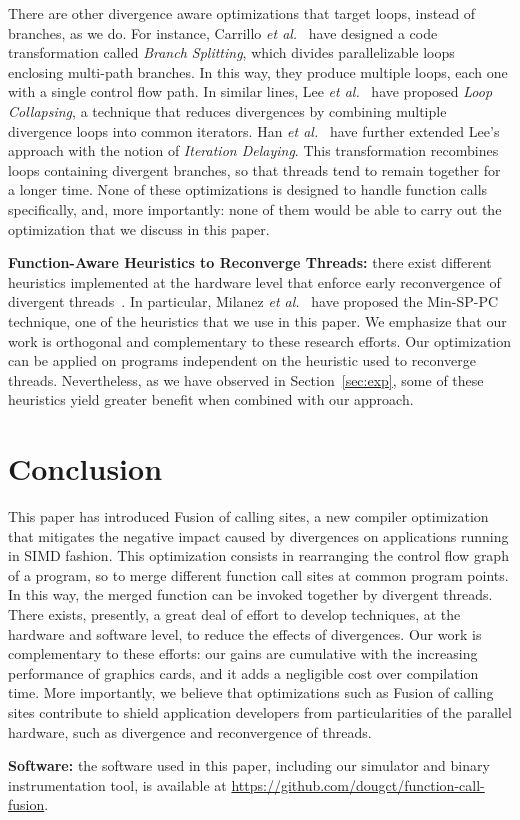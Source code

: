 \documentclass[times,10pt,twocolumn]{article}
\begin{document}
There are other divergence aware optimizations that target loops, instead of
branches, as we do.
For instance, Carrillo {\em et al.}~\cite{Carrillo09} have designed a code
transformation called {\em Branch Splitting}, which divides parallelizable loops
enclosing multi-path branches.
In this way, they produce multiple loops, each one with a single control flow
path.
In similar lines, Lee {\em et al.}~\cite{Lee09} have proposed {\em Loop
Collapsing}, a technique that reduces divergences by combining multiple
divergence loops into common iterators.
Han {\em et al.}~\cite{Han11} have further extended Lee's approach with the
notion of {\em Iteration Delaying}.
This transformation recombines loops containing divergent branches, so that
threads tend to remain together for a longer time.
None of these optimizations is designed to handle
function calls specifically, and, more importantly: none of them would be
able to carry out the optimization that we discuss in this paper.

\noindent
\textbf{Function-Aware Heuristics to Reconverge Threads:}
there exist different heuristics implemented at the hardware level that
enforce early reconvergence of divergent
threads~\cite{Dechene10,Gonzalez08,Long10}.
In particular, Milanez {\em et al.}~\cite{Milanez14} have proposed the
Min-SP-PC technique, one of the heuristics that we use in this paper.
We emphasize that our work is orthogonal and complementary to these research
efforts.
Our optimization can be applied on programs independent on the heuristic
used to reconverge threads.
Nevertheless, as we have observed in Section~\ref{sec:exp}, some of these
heuristics yield greater benefit when combined with our approach.

\section{Conclusion}
\label{sec:con}

This paper has introduced Fusion of calling sites, a new compiler optimization that mitigates the
negative impact caused by divergences on applications running in SIMD fashion.
This optimization consists in rearranging the control flow graph of a program,
so to merge different function call sites at common program points.
In this way, the merged function can be invoked together by divergent
threads.
There exists, presently, a great deal of effort to develop techniques, at the
hardware and software level, to reduce the effects of divergences.
Our work is complementary to these efforts: our gains are cumulative with
the increasing performance of graphics cards, and it adds a negligible cost
over compilation time.
More importantly, we believe that optimizations such as Fusion of calling sites
contribute to shield application developers from particularities of
the parallel hardware, such as divergence and reconvergence of threads.

\noindent
\textbf{Software: } the software used in this paper, including our simulator
and binary instrumentation tool, is available at \url{https://github.com/dougct/function-call-fusion}.




\end{document}
